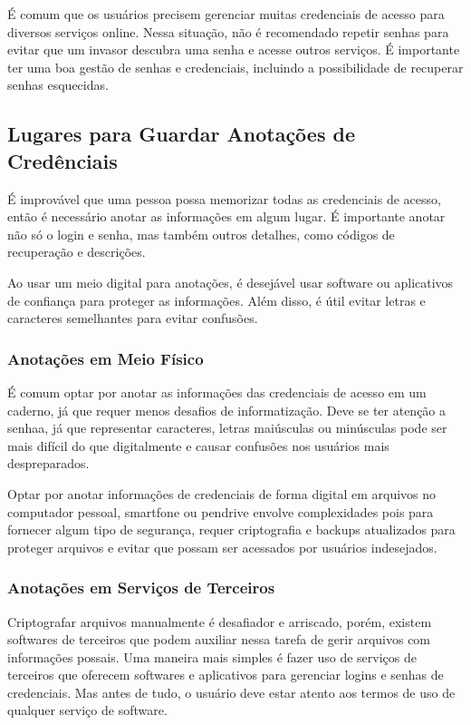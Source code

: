 \documentclass[12pt]{article}
\begin{document}
É comum que os usuários precisem gerenciar muitas credenciais de acesso
para diversos serviços online.
Nessa situação, não é recomendado repetir senhas para evitar que um invasor
descubra uma senha e acesse outros serviços.
É importante ter uma boa gestão de senhas e credenciais, incluindo a
possibilidade de recuperar senhas esquecidas.

\subsection{Lugares para Guardar Anotações de Credênciais}

É improvável que uma pessoa possa memorizar todas as credenciais de acesso,
então é necessário anotar as informações em algum lugar.
É importante anotar não só o login e senha, mas também outros detalhes,
como códigos de recuperação e descrições.

Ao usar um meio digital para anotações, é desejável usar software ou
aplicativos de confiança para proteger as informações. Além disso, é útil
evitar letras e caracteres semelhantes para evitar confusões.

\subsubsection{Anotações em Meio Físico}

É comum optar por anotar as informações das credenciais de acesso em um
caderno, já que requer menos desafios de informatização.
Deve se ter atenção a senhaa, já que representar caracteres, letras
maiúsculas ou minúsculas pode ser mais difícil do que digitalmente e
causar confusões nos usuários mais despreparados.

Optar por anotar informações de credenciais de forma digital em arquivos
no computador pessoal, smartfone ou pendrive envolve complexidades pois
para fornecer algum tipo de segurança, requer criptografia e backups
atualizados para proteger arquivos e evitar que possam ser acessados por
usuários indesejados.

\subsubsection{Anotações em Serviços de Terceiros}

Criptografar arquivos manualmente é desafiador e arriscado, porém,
existem softwares de terceiros que podem auxiliar nessa tarefa de gerir
arquivos com informações possais.
Uma maneira mais simples é fazer uso de serviços de terceiros que
oferecem softwares e aplicativos para gerenciar logins e senhas de
credenciais.
Mas antes de tudo, o usuário deve estar atento aos termos de uso de
qualquer serviço de software.
\end{document}
